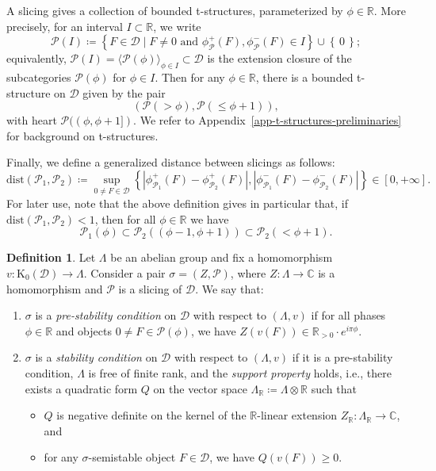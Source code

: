 \documentclass[11pt, reqno]{amsart}
\numberwithin{equation}{section}
\theoremstyle{plain}
\theoremstyle{remark}
\theoremstyle{definition}
\newtheorem{definition}[theorem]{Definition}
\theoremstyle{italicsname}
\newcommand{\st}{\mid}
\newcommand{\set}[1]{\left\{ \, #1 \, \right\}}
\newcommand{\cD}{\mathscr{D}}
\newcommand{\cP}{\mathscr{P}}
\newcommand{\rK}{\mathrm{K}}
\def\CC{\ensuremath{\mathbb{C}}}
\def\RR{\ensuremath{\mathbb{R}}}
\begin{document}
A slicing gives a collection of bounded t-structures, parameterized by $\phi\in\RR$. 
More precisely, for an interval $I\subset\RR$, we write 
\begin{equation*}
\cP(I)\coloneqq\left\{F\in\cD \st F\neq 0 \text{ and } \phi_\cP^+(F),\phi_\cP^-(F)\in I\right\}\cup \set{ 0};
\end{equation*}
equivalently, $\cP(I)= \langle\cP(\phi)\rangle_{\phi \in I}\subset\cD$ is the extension closure of the subcategories $\cP(\phi)$ for $\phi \in I$. 
Then for any $\phi \in \RR$, there is a bounded t-structure on $\cD$ given by the pair 
\begin{equation}
\label{tau-phi-in-text}
    (\cP( > \phi), \cP( \leq \phi + 1)) ,
\end{equation}
with heart $\cP((\phi,\phi+1])$. 
We refer to Appendix~\ref{app-t-structures-preliminaries} for background on t-structures.

Finally, we define a generalized distance between slicings as follows:
\[
\mathrm{dist}(\cP_1,\cP_2)\coloneqq \sup_{0\neq F\in \cD}\left\{\left|\phi^+_{\cP_1}(F)-\phi^+_{\cP_2}(F)\right|,\left|\phi^-_{\cP_1}(F)-\phi^-_{\cP_2}(F)\right|\right\}\in [0,+\infty].
\]
For later use, note that the above definition gives in particular that, if $\mathrm{dist}(\cP_1,\cP_2)<1$, then for all $\phi \in \RR$ we have 
\begin{equation}\label{eq:Distance}
\cP_1(\phi)\subset\cP_2((\phi-1,\phi+1))\subset\cP_2(<\phi+1).
\end{equation}

\begin{definition}
\label{definition-stability-condition}
Let $\Lambda$ be an abelian group and fix a homomorphism $v\colon\rK_0(\cD) \to\Lambda$.
Consider a pair $\sigma=(Z,\cP)$, where $Z\colon\Lambda\rightarrow\CC$ is a homomorphism and $\cP$ is a slicing of $\cD$. 
We say that: 
\begin{enumerate}[{\rm (1)}]
    \item $\sigma$ is a \emph{pre-stability condition} on $\cD$ with respect to $(\Lambda,v)$ if for all phases $\phi \in \RR$ and objects $0 \neq F \in \cP(\phi)$, we have $Z(v(F)) \in\RR_{>0}\cdot e^{i\pi\phi}$. 
    \item $\sigma$ is a \emph{stability condition} on $\cD$ with respect to $(\Lambda,v)$ if it is a pre-stability condition, $\Lambda$ is free of finite rank, and the \emph{support property} holds, i.e., there exists a quadratic form $Q$ on the vector space $\Lambda_\RR\coloneqq\Lambda\otimes\RR$ such that
\begin{itemize}
\item $Q$ is negative definite on the kernel of the $\RR$-linear extension $Z_{\RR}\colon\Lambda_\RR\to\CC$, and
\item for any $\sigma$-semistable object $F \in \cD$, we have $Q(v(F)) \geqslant 0$. 
\end{itemize}
\end{enumerate}
\end{definition}
\end{document}
